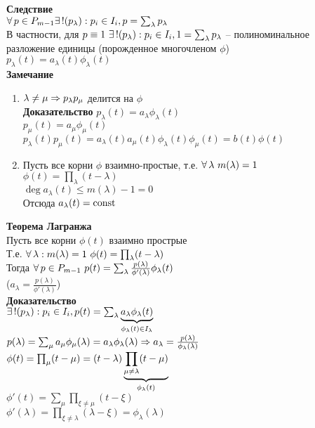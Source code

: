 \documentclass[12pt]{article}
\begin{document}
\textbf{Следствие}\\
$\fall p \in P_{m-1} \ex ! (p_\lambda): p_i \in I_i, p=\sum_\lambda p_\lambda$\\
В частности, для $p\equiv 1\ \ex! (p_\lambda): p_i \in I_i, 1=\sum_\lambda p_\lambda$ -- полиноминальное разложение единицы (порожденное многочленом $\phi$)\\
$p_\lambda(t) = a_\lambda(t)\phi_\lambda(t)$\\
\textbf{Замечание}
\begin{enumerate}
    \item $\lambda \neq \mu \Rto p_\lambda p_\mu$ делится на $\phi$\\
    \textbf{Доказательство}
    $p_\lambda(t) = a_\lambda \phi_\lambda(t)$\\
    $p_\mu(t) = a_\mu \phi_\mu(t)$\\
    $p_\lambda(t)p_\mu(t) = a_\lambda(t)a_\mu(t)\phi_\lambda(t)\phi_\mu(t) = b(t)\phi(t)$
    \item Пусть все корни $\phi$ взаимно-простые, т.е. $\fall \lambda\ m(\lambda) = 1$\\
    $\phi(t) = \prod_\lambda (t-\lambda)$\\
    $\deg a_\lambda(t) \leq m(\lambda) - 1 = 0$\\
    Отсюда $a_\lambda(t) = \const$
\end{enumerate}
\textbf{Теорема Лагранжа}\\
Пусть все корни $\phi(t)$ взаимно прострые\\
Т.е. $\fall \lambda: m(\lambda) = 1\ \phi(t) = \prod_\lambda (t-\lambda)$\\
Тогда $\fall p \in P_{m-1}\ p(t) = \sum_\lambda \frac{p(\lambda)}{\phi'(\lambda)}\phi_\lambda(t)$\\
($a_\lambda = \frac{p(\lambda)}{\phi'(\lambda)}$)\\
\textbf{Доказательство}\\
$\ex! (p_\lambda): p_i \in I_i, p(t) = \sum_\lambda \ub{\phi_\lambda(t)\in I_\lambda}{a_\lambda \phi_\lambda(t)}$\\
$p(\lambda) = \sum_\mu a_\mu \phi_\mu(\lambda) = a_\lambda \phi_\lambda(\lambda) \Rto a_\lambda = \frac{p(\lambda)}{\phi_\lambda(\lambda)}$\\
$\phi(t) = \prod_\mu (t-\mu) = (t-\lambda) \ub{\phi_\lambda(t)}{\prod_{\mu \neq \lambda} (t-\mu)}$\\
$\phi'(t) = \sum_\mu \prod_{\xi \neq \mu}(t-\xi)$\\
$\phi'(\lambda) = \prod_{\xi \neq \lambda} (\lambda - \xi) = \phi_\lambda(\lambda)$\\
\end{document}
